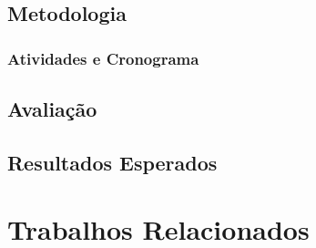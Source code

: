 \documentclass[a4paper,12pt]{article}
\begin{document}
\subsection{Metodologia}\label{sec:metodologia}

   
\subsubsection{Atividades e Cronograma}\label{sec:atividadeECronograma}


\subsection{Avaliação}\label{sec:avaliacao}

\subsection{Resultados Esperados}\label{sec:ResultadosEsperados}

\section{Trabalhos Relacionados}\label{sec:relacionados}
 
     

\singlespacing 


\end{document}
